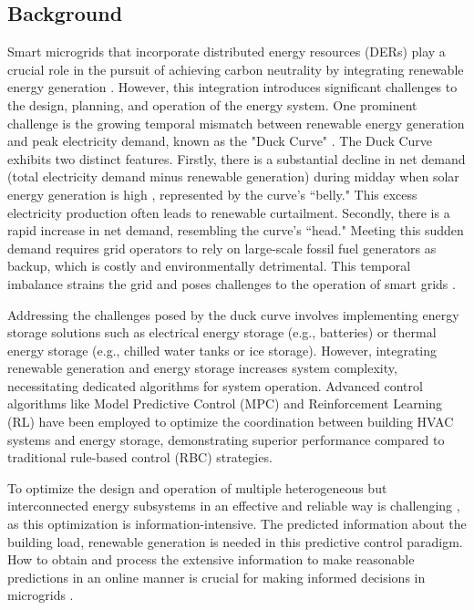 
\subsection{Background}
Smart microgrids that incorporate distributed energy resources (DERs) play a crucial role in the pursuit of achieving carbon neutrality by integrating renewable energy generation \cite{li2023modeling}. However, this integration introduces significant challenges to the design, planning, and operation of the energy system. One prominent challenge is the growing temporal mismatch between renewable energy generation and peak electricity demand, known as the "Duck Curve" \cite{DuckC_ES}. The Duck Curve exhibits two distinct features. Firstly, there is a substantial decline in net demand (total electricity demand minus renewable generation) during midday when solar energy generation is high \cite{wang2023site}, represented by the curve's ``belly." This excess electricity production often leads to renewable curtailment. Secondly, there is a rapid increase in net demand, resembling the curve's ``head." Meeting this sudden demand requires grid operators to rely on large-scale fossil fuel generators as backup, which is costly and environmentally detrimental. This temporal imbalance strains the grid and poses challenges to the operation of smart grids \cite{widjaja2023general}.

Addressing the challenges posed by the duck curve involves implementing energy storage solutions such as electrical energy storage (e.g., batteries) or thermal energy storage (e.g., chilled water tanks or ice storage). However, integrating renewable generation and energy storage increases system complexity, necessitating dedicated algorithms for system operation. Advanced control algorithms like Model Predictive Control (MPC) \cite{kim2022site} and Reinforcement Learning (RL) \cite{touzani2021controlling} have been employed to optimize the coordination between building HVAC systems and energy storage, demonstrating superior performance compared to traditional rule-based control (RBC) strategies.

To optimize the design and operation of multiple heterogeneous but interconnected energy subsystems in an effective and reliable way is challenging \cite{Energy_model_complex}, as this optimization is information-intensive. The predicted information about the building load, renewable generation is needed in this predictive control paradigm. How to obtain and process the extensive information to make reasonable predictions in an online manner is crucial for making informed decisions in microgrids \cite{Intensive_data_grid}.

